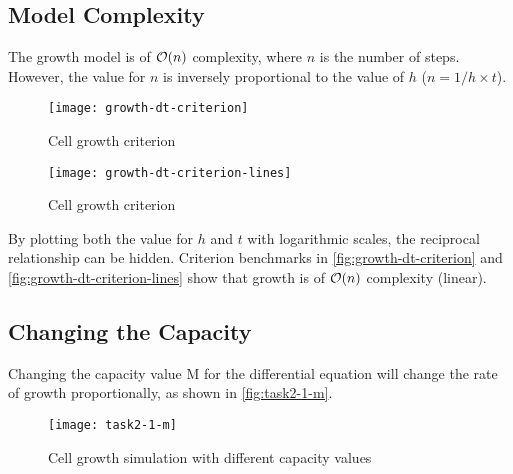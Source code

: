 \clearpage

\subsection{Model Complexity}

The growth model is of $\mathcal{O}(n)$ complexity, where $n$ is the number of steps.
However, the value for $n$ is inversely proportional to the value of $h$ ($n = 1/h \times t$).



\begin{figure}[ht]
    \centering
    \texttt{[image: growth-dt-criterion]}
    \caption[Cell growth criterion]{Cell growth criterion}
    \label{fig:growth-dt-criterion}
\end{figure}

\begin{figure}[ht]
    \centering
    \texttt{[image: growth-dt-criterion-lines]}
    \caption[Cell growth criterion]{Cell growth criterion}
    \label{fig:growth-dt-criterion-lines}
\end{figure}

By plotting both the value for $h$ and $t$ with logarithmic scales, the reciprocal relationship can be hidden.
Criterion benchmarks in \autoref{fig:growth-dt-criterion} and \autoref{fig:growth-dt-criterion-lines} show that growth is of $\mathcal{O}(n)$ complexity (linear).


\clearpage

\subsection{Changing the Capacity}

Changing the capacity value M for the differential equation will change the rate of growth proportionally, as shown in \autoref{fig:task2-1-m}. 

\begin{figure}[ht]
    \centering
    \texttt{[image: task2-1-m]}
    \caption[Cell growth simulation with different capacity values]{Cell growth simulation with different capacity values}
    \label{fig:task2-1-m}
\end{figure}

